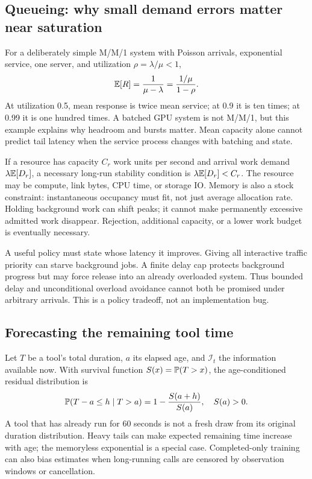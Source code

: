 \subsection{Queueing: why small demand errors matter near saturation}
For a deliberately simple M/M/1 system with Poisson arrivals, exponential
service, one server, and utilization $\rho=\lambda/\mu<1$,
\begin{equation}
 \mathbb{E}[R]=\frac{1}{\mu-\lambda}
       =\frac{1/\mu}{1-\rho}.
 \label{eq:mm1}
\end{equation}
At utilization 0.5, mean response is twice mean service; at 0.9 it is ten times;
at 0.99 it is one hundred times. A batched GPU system is not M/M/1, but this
example explains why headroom and bursts matter. Mean capacity alone cannot
predict tail latency when the service process changes with batching and state.


If a resource has capacity $C_r$ work units per second and arrival work demand
$\lambda\mathbb{E}[D_r]$, a necessary long-run stability condition is
$\lambda\mathbb{E}[D_r]<C_r$. The resource may be compute, link bytes, CPU time, or
storage IO. Memory is also a stock constraint: instantaneous occupancy must
fit, not just average allocation rate. Holding background work can shift peaks;
it cannot make permanently excessive admitted work disappear. Rejection,
additional capacity, or a lower work budget is eventually necessary.

A useful policy must state whose latency it improves. Giving all interactive
traffic priority can starve background jobs. A finite delay cap protects
background progress but may force release into an already overloaded system.
Thus bounded delay and unconditional overload avoidance cannot both be promised
under arbitrary arrivals. This is a policy tradeoff, not an implementation bug.

\subsection{Forecasting the remaining tool time}
Let $T$ be a tool's total duration, $a$ its elapsed age, and $\mathcal I_t$ the
information available now. With survival function $S(x)=\mathbb{P}(T>x)$, the
age-conditioned residual distribution is
\begin{equation}
 \mathbb{P}(T-a\le h\mid T>a)=1-\frac{S(a+h)}{S(a)},\quad S(a)>0.
 \label{eq:residual}
\end{equation}
A tool that has already run for 60 seconds is not a fresh draw from its original
duration distribution. Heavy tails can make expected remaining time increase
with age; the memoryless exponential is a special case. Completed-only training
can also bias estimates when long-running calls are censored by observation
windows or cancellation.

